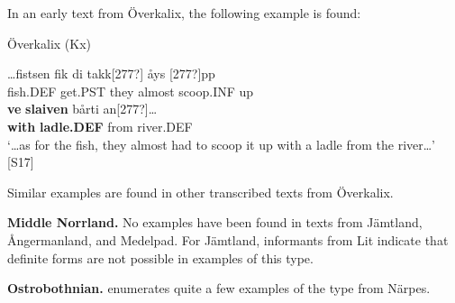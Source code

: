 In an early text from Överkalix, the following example is found:


\item 

Överkalix (Kx)



 \ea\label{}
\gll …fistsen  fik  di  takk[277?]  åys  [277?]pp\\


fish.DEF  get.PST  they  almost  scoop.INF  up\\

 \ea\label{}
\gll \textbf{ve} \textbf{slaiven} bårti  an[277?]…\\


\textbf{with} \textbf{ladle.DEF} from  river.DEF\\

\glt ‘…as for the fish, they almost had to scoop it up with a ladle from the river…’ [S17]

\z

Similar examples are found in other transcribed texts from Överkalix. 


\textbf{Middle Norrland.} No examples have been found in texts from Jämtland, Ångermanland, and Medelpad. For Jämtland, informants from Lit indicate that definite forms are not possible in examples of this type.


\textbf{Ostrobothnian. }\citet{Hummelstedt1934} enumerates quite a few examples of the type from Närpes. 


\item 

